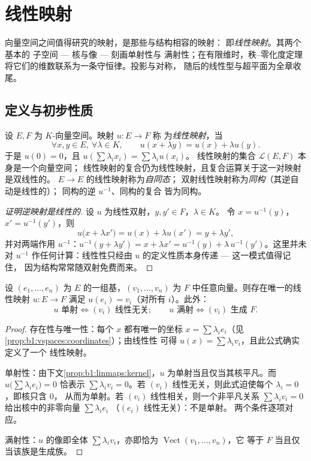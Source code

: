 \chapter{线性映射}\label{ch:b1:linmaps}

向量空间之间值得研究的映射，是那些与结构相容的映射：
即\emph{线性映射}。其两个基本的
子空间 --- 核与像 --- 刻画单射性与
满射性；在有限维时，秩--零化度定理
将它们的维数联系为一条守恒律。投影与对称，
随后的线性型与超平面为全章收尾。

\section{定义与初步性质}

\begin{definition}\label{def:b1:linmaps:def}
设 $E, F$ 为 $K$-向量空间。映射 $u \colon E \to F$ 称
为\emph{线性映射}，当
\[
\forall x, y \in E,\ \forall \lambda \in K, \qquad
u(x + \lambda y) = u(x) + \lambda u(y).
\]
于是 $u(0) = 0$，且 $u(\sum \lambda_i x_i) = \sum \lambda_i u(x_i)$。
线性映射的集合 $\mathcal{L}(E, F)$ 本身是一个向量空间；
线性映射的复合仍为线性映射，且复合运算关于这一对映射是双线性的。
$E \to E$ 的线性映射称为\emph{自同态}；
双射线性映射称为\emph{同构}（其逆自动是线性的）；
同构的逆 $u^{-1}$、同构的复合
皆为同构。
\end{definition}

\begin{proof}[证明逆映射是线性的]
设 $u$ 为线性双射，$y, y' \in F$，$\lambda \in K$。
令 $x = u^{-1}(y)$，$x' = u^{-1}(y')$，则
\[
u\bigl(x + \lambda x'\bigr) = u(x) + \lambda u(x')
= y + \lambda y' ,
\]
并对两端作用 $u^{-1}$：$u^{-1}(y + \lambda y') = x
+ \lambda x' = u^{-1}(y) + \lambda\,u^{-1}(y')$。这里并未对
$u^{-1}$ 作任何计算：线性性只经由
$u$ 的定义性质本身传递 --- 这一模式值得记住，
因为结构常常随双射免费而来。
\end{proof}

\begin{proposition}[线性映射由基上的值确定]\label{prop:b1:linmaps:basis}
设 $(e_1, \dots, e_n)$ 为 $E$ 的一组基，$(v_1, \dots, v_n)$
为 $F$ 中任意向量。则存在唯一的线性映射 $u \colon
E \to F$ 满足 $u(e_i) = v_i$（对所有 $i$）。此外：
\[
u \text{ 单射} \iff (v_i) \text{ 线性无关};
\qquad
u \text{ 满射} \iff (v_i) \text{ 生成 } F .
\]
\end{proposition}

\begin{proof}
存在性与唯一性：每个 $x$ 都有唯一的坐标 $x = \sum
\lambda_i e_i$（见\cref{prop:b1:vspaces:coordinates}）；由线性性
可得 $u(x) = \sum \lambda_i v_i$，且此公式确实定义了一个
线性映射。

单射性：由下文\cref{prop:b1:linmaps:kernel}，$u$
为单射当且仅当其核平凡。而 $u\bigl(\sum\lambda_i
e_i\bigr) = 0$ 恰表示 $\sum\lambda_i v_i = 0$。若 $(v_i)$
线性无关，则此式迫使每个 $\lambda_i = 0$，即核只含 $0$，
从而为单射。若 $(v_i)$ 线性相关，则一个非平凡关系
$\sum\lambda_i v_i = 0$ 给出核中的非零向量 $\sum\lambda_i e_i$
（$(e_i)$ 线性无关）：不是单射。
两个条件逐项对应。

满射性：$u$ 的像即全体 $\sum\lambda_i
v_i$，亦即恰为 $\operatorname{Vect}(v_1, \dots, v_n)$，它
等于 $F$ 当且仅当该族是生成族。
\end{proof}

